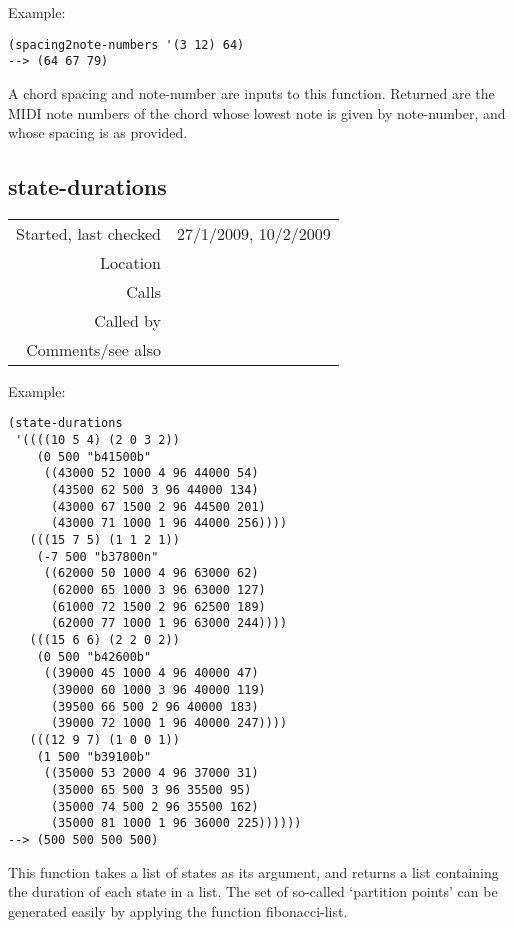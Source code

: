 \vspace{0.5cm}
\noindent Example:
\begin{verbatim}
(spacing2note-numbers '(3 12) 64)
--> (64 67 79)
\end{verbatim}

\noindent A chord spacing and note-number are inputs
to this function. Returned are the MIDI note numbers
of the chord whose lowest note is given by
note-number, and whose spacing is as provided.


\subsection*{state-durations}\label{fun:state-durations}

\vspace{0.3cm}
\begin{tabular}{r|p{8cm}}
Started, last checked & 27/1/2009, 10/2/2009 \\
Location & \nameref{sec:markov-compose} \\
Calls & \\
Called by & \nameref{fun:states2datapoints} \\
Comments/see also & \nameref{fun:state-durations-by-beat}
\end{tabular}

\vspace{0.5cm}
\noindent Example:
\begin{verbatim}
(state-durations
 '((((10 5 4) (2 0 3 2))
    (0 500 "b41500b"
     ((43000 52 1000 4 96 44000 54)
      (43500 62 500 3 96 44000 134)
      (43000 67 1500 2 96 44500 201)
      (43000 71 1000 1 96 44000 256))))
   (((15 7 5) (1 1 2 1))
    (-7 500 "b37800n"
     ((62000 50 1000 4 96 63000 62)
      (62000 65 1000 3 96 63000 127)
      (61000 72 1500 2 96 62500 189)
      (62000 77 1000 1 96 63000 244))))
   (((15 6 6) (2 2 0 2))
    (0 500 "b42600b"
     ((39000 45 1000 4 96 40000 47)
      (39000 60 1000 3 96 40000 119)
      (39500 66 500 2 96 40000 183)
      (39000 72 1000 1 96 40000 247))))
   (((12 9 7) (1 0 0 1))
    (1 500 "b39100b"
     ((35000 53 2000 4 96 37000 31)
      (35000 65 500 3 96 35500 95)
      (35000 74 500 2 96 35500 162)
      (35000 81 1000 1 96 36000 225))))))
--> (500 500 500 500)
\end{verbatim}

\noindent This function takes a list of states as its
argument, and returns a list containing the duration
of each state in a list. The set of so-called
`partition points' can be generated easily by applying
the function fibonacci-list.


